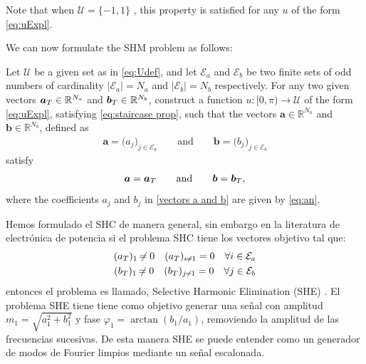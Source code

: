 \documentclass[twocolumn]{autart}    %
\begin{document}
 
Note that when $\mathcal{U} = \{-1,1\}$ , this property is satisfied for any $u$ of the form \eqref{eq:uExpl}.

We can now formulate the SHM problem as follows:
\newline
\begin{problem}[SHM]\label{pb:SHEp}
Let $\mathcal{U}$ be a given set as in \eqref{eq:Udef}, and let $\mathcal{E} _a $ and $\mathcal{E} _b $ be two finite sets of odd numbers of cardinality $|\mathcal{E}_a| = N_a $ and $ |\mathcal{E} _b| = N_b$ respectively. For any two given vectors $\aT \in \mathbb{R}^{N_a}$ and $\bT \in \mathbb{R}^{N_b} $, construct a function $u: [0,\pi)\to\mathcal{U}$ of the form \eqref{eq:uExpl}, satisfying \eqref{eq:staircase prop}, such that the vectors $\bm{a} \in \mathbb{R}^{N_a}$ and $\bm{b} \in \mathbb{R}^{N_b}$, defined as
\begin{align}\label{vectors a and b}
	\bm{a} = \big( a_j \big)_{j\in \mathcal{E}_a} \qquad \text{and} \qquad
	\bm{b} = \big( b_j \big)_{j\in \mathcal{E}_b}
\end{align}
satisfy
\begin{align*} 
	\bm{a} = \aT \qquad \text{and} \qquad \bm{b} = \bT,
\end{align*}
where the coefficients $a_j$ and $b_j$ in \eqref{vectors a and b} are given by \eqref{eq:an}.
\end{problem}  
\vspace{1em}

\JOStart
\begin{remark}[SHE]\label{remark:SHE}
	Hemos formulado el SHC de  manera  general, sin embargo en la literatura de electrónica de potencia si el problema SHC tiene los vectores objetivo tal que: 
	\begin{gather}
		\notag (a_T)_1 \neq 0  \hspace{1em} (a_T)_{i\neq1} = 0 \hspace{1em} \forall i \in \mathcal{E}_a \\
		\notag (b_T)_1 \neq 0  \hspace{1em} (b_T)_{j\neq1} = 0 \hspace{1em} \forall j \in \mathcal{E}_b 
	\end{gather}
	entonces el problema es llamado, Selective Harmonic Elimination (SHE) \cite{Sun1996}. El problema SHE tiene tiene como objetivo generar una señal con  amplitud $m_1 = \sqrt{a_1^2+b_1^2}$ y  fase $\varphi_1=\arctan(b_1/a_1)$, removiendo la amplitud de las frecuencias sucesivas. De esta manera SHE se puede entender como un generador de  modos de Fourier limpios mediante un señal escalonada.
\end{remark}
\JOEnd
\end{document}
